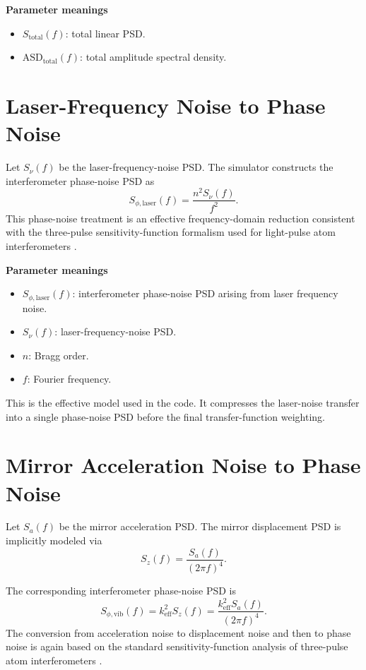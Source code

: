 \documentclass[11pt,a4paper]{article}
\begin{document}
\textbf{Parameter meanings}
\begin{itemize}[leftmargin=1.5em]
  \item $S_{\mathrm{total}}(f)$: total linear PSD.
  \item $\mathrm{ASD}_{\mathrm{total}}(f)$: total amplitude spectral density.
\end{itemize}

\section{Laser-Frequency Noise to Phase Noise}

Let $S_{\nu}(f)$ be the laser-frequency-noise PSD. The simulator constructs the interferometer phase-noise PSD as
\begin{equation}
  S_{\phi,\mathrm{laser}}(f) = \frac{n^2 S_{\nu}(f)}{f^2}.
\end{equation}
This phase-noise treatment is an effective frequency-domain reduction consistent with the three-pulse sensitivity-function formalism used for light-pulse atom interferometers \cite{Cheinet2008}.

\textbf{Parameter meanings}
\begin{itemize}[leftmargin=1.5em]
  \item $S_{\phi,\mathrm{laser}}(f)$: interferometer phase-noise PSD arising from laser frequency noise.
  \item $S_{\nu}(f)$: laser-frequency-noise PSD.
  \item $n$: Bragg order.
  \item $f$: Fourier frequency.
\end{itemize}

This is the effective model used in the code. It compresses the laser-noise transfer into a single phase-noise PSD before the final transfer-function weighting.

\section{Mirror Acceleration Noise to Phase Noise}

Let $S_a(f)$ be the mirror acceleration PSD. The mirror displacement PSD is implicitly modeled via
\begin{equation}
  S_z(f) = \frac{S_a(f)}{(2\pi f)^4}.
\end{equation}

The corresponding interferometer phase-noise PSD is
\begin{equation}
  S_{\phi,\mathrm{vib}}(f) = k_{\mathrm{eff}}^2 S_z(f)
  = \frac{k_{\mathrm{eff}}^2 S_a(f)}{(2\pi f)^4}.
\end{equation}
The conversion from acceleration noise to displacement noise and then to phase noise is again based on the standard sensitivity-function analysis of three-pulse atom interferometers \cite{Cheinet2008}.
\end{document}
